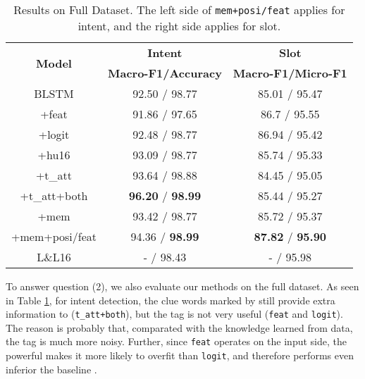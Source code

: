 \begin{table}
\setlength{\tabcolsep}{0.23em}
\centering
\small{
\begin{tabular}{|c|c|c|}

\hline
\multirow{2}{*}{\textbf{Model}} & \textbf{Intent} & \textbf{Slot} \\
\cline{2-3}
  & \textbf{Macro-F1/Accuracy} &  \textbf{Macro-F1/Micro-F1} \\
\hline
\rowcolor{Gray} BLSTM & 92.50 / 98.77  & 85.01 / 95.47\\
\hline
+feat & 91.86 / 97.65 & 86.7 / 95.55\\
\hline
\rowcolor{Gray} +logit & 92.48 / 98.77 & 86.94 / 95.42  \\
\hline
+hu16 & 93.09 / 98.77 & 85.74 / 95.33  \\
\hline
\rowcolor{Gray} +t\_att & 93.64 / 98.88  & 84.45 / 95.05\\
\hline
+t\_att+both & \textbf{96.20} / \textbf{98.99} & 85.44 / 95.27 \\
\hline
\rowcolor{Gray} +mem & 93.42 / 98.77 & 85.72 / 95.37\\
\hline
+mem+posi/feat & 94.36 / \textbf{98.99} & \textbf{87.82} / \textbf{95.90} \\
\hline
\hline
\rowcolor{Gray} L\&L16 & - / 98.43 & - / 95.98\\
\hline

\end{tabular}
}
\caption{Results on Full Dataset. The left side of \texttt{mem+posi/feat} applies for intent, and the right side applies for slot.}
\label{tab_full}
\end{table}

To answer question (2), we also evaluate our methods on the full dataset.
As seen in Table \ref{tab_full}, for intent detection,
the clue words marked by \RE still provide extra information to \NN (\texttt{t\_att+both}),
but the \RE tag is not very useful (\texttt{feat} and \texttt{logit}).
The reason is probably that, comparated with the knowledge learned from data, the \RE tag is much more noisy.
Further, since \texttt{feat} operates on the input side, the powerful \NN makes it more likely to overfit than \texttt{logit}, and therefore performs even inferior the baseline \BLSTM.

